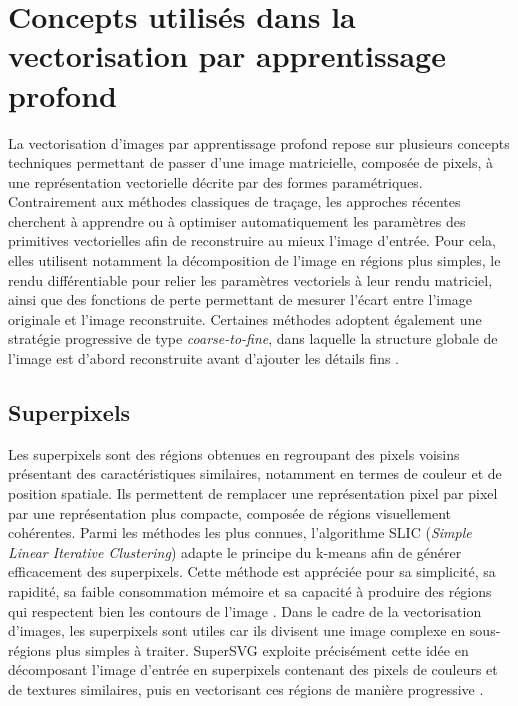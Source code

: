 \documentclass[12pt, a4paper, oneside]{report}
\begin{document}
\section{Concepts utilisés dans la vectorisation par apprentissage profond}
\label{sec:concepts_vectorisation}
La vectorisation d'images par apprentissage profond repose sur plusieurs concepts techniques permettant de passer d'une image matricielle, composée de pixels, à une représentation vectorielle décrite par des formes paramétriques. Contrairement aux méthodes classiques de traçage, les approches récentes cherchent à apprendre ou à optimiser automatiquement les paramètres des primitives vectorielles afin de reconstruire au mieux l'image d'entrée. Pour cela, elles utilisent notamment la décomposition de l'image en régions plus simples, le rendu différentiable pour relier les paramètres vectoriels à leur rendu matriciel, ainsi que des fonctions de perte permettant de mesurer l'écart entre l'image originale et l'image reconstruite. Certaines méthodes adoptent également une stratégie progressive de type \textit{coarse-to-fine}, dans laquelle la structure globale de l'image est d'abord reconstruite avant d'ajouter les détails fins \cite{li2020diffvg,hu2024supersvg}.
    \subsection{Superpixels}
    \label{sec:superpixels}
	Les superpixels sont des régions obtenues en regroupant des pixels voisins présentant des caractéristiques similaires, notamment en termes de couleur et de position spatiale. Ils permettent de remplacer une représentation pixel par pixel par une représentation plus compacte, composée de régions visuellement cohérentes. Parmi les méthodes les plus connues, l'algorithme SLIC (\textit{Simple Linear Iterative Clustering}) adapte le principe du k-means afin de générer efficacement des superpixels. Cette méthode est appréciée pour sa simplicité, sa rapidité, sa faible consommation mémoire et sa capacité à produire des régions qui respectent bien les contours de l'image \cite{achanta2012slic}. Dans le cadre de la vectorisation d'images, les superpixels sont utiles car ils divisent une image complexe en sous-régions plus simples à traiter. SuperSVG exploite précisément cette idée en décomposant l'image d'entrée en superpixels contenant des pixels de couleurs et de textures similaires, puis en vectorisant ces régions de manière progressive \cite{hu2024supersvg}.
\end{document}
